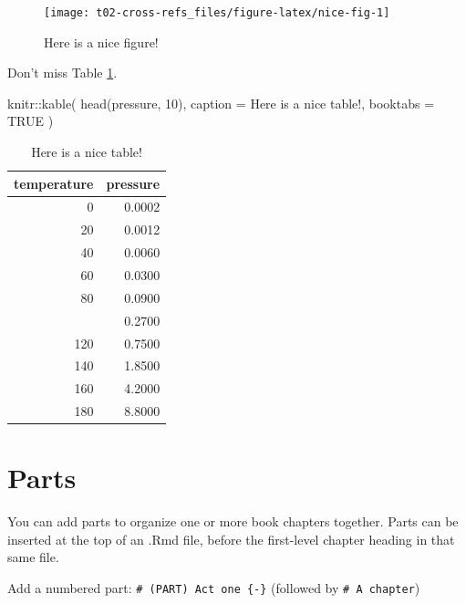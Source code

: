 \documentclass[
]{book}
\newenvironment{Shaded}{\begin{snugshade}}{\end{snugshade}}
\newcommand{\AttributeTok}[1]{\textcolor[rgb]{0.77,0.63,0.00}{#1}}
\newcommand{\ConstantTok}[1]{\textcolor[rgb]{0.00,0.00,0.00}{#1}}
\newcommand{\DecValTok}[1]{\textcolor[rgb]{0.00,0.00,0.81}{#1}}
\newcommand{\FunctionTok}[1]{\textcolor[rgb]{0.00,0.00,0.00}{#1}}
\newcommand{\NormalTok}[1]{#1}
\newcommand{\SpecialCharTok}[1]{\textcolor[rgb]{0.00,0.00,0.00}{#1}}
\newcommand{\StringTok}[1]{\textcolor[rgb]{0.31,0.60,0.02}{#1}}
\theoremstyle{definition}
\theoremstyle{definition}
\theoremstyle{definition}
\theoremstyle{definition}
\theoremstyle{remark}
\begin{document}
\begin{figure}

{\centering \texttt{[image: t02-cross-refs\_files/figure-latex/nice-fig-1]} 

}

\caption{Here is a nice figure!}\label{fig:nice-fig}
\end{figure}

Don't miss Table \ref{tab:nice-tab}.

\begin{Shaded}
\begin{Highlighting}[]
\NormalTok{knitr}\SpecialCharTok{::}\FunctionTok{kable}\NormalTok{(}
  \FunctionTok{head}\NormalTok{(pressure, }\DecValTok{10}\NormalTok{), }\AttributeTok{caption =} \StringTok{\textquotesingle{}Here is a nice table!\textquotesingle{}}\NormalTok{,}
  \AttributeTok{booktabs =} \ConstantTok{TRUE}
\NormalTok{)}
\end{Highlighting}
\end{Shaded}

\begin{table}

\caption{\label{tab:nice-tab}Here is a nice table!}
\centering
\begin{tabular}[t]{rr}
\toprule
temperature & pressure\\
\midrule
0 & 0.0002\\
20 & 0.0012\\
40 & 0.0060\\
60 & 0.0300\\
80 & 0.0900\\
\addlinespace
100 & 0.2700\\
120 & 0.7500\\
140 & 1.8500\\
160 & 4.2000\\
180 & 8.8000\\
\bottomrule
\end{tabular}
\end{table}

\hypertarget{parts}{%
\chapter{Parts}\label{parts}}

You can add parts to organize one or more book chapters together. Parts can be inserted at the top of an .Rmd file, before the first-level chapter heading in that same file.

Add a numbered part: \texttt{\#\ (PART)\ Act\ one\ \{-\}} (followed by \texttt{\#\ A\ chapter})
\end{document}
